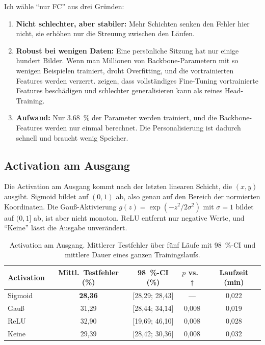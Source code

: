 Ich wähle \enquote{nur FC} aus drei Gründen:
\begin{enumerate}[nosep]
  \item \textbf{Nicht schlechter, aber stabiler:} Mehr Schichten senken den
        Fehler hier nicht, sie erhöhen nur die Streuung zwischen den Läufen.
  \item \textbf{Robust bei wenigen Daten:} Eine persönliche Sitzung hat nur
        einige hundert Bilder. Wenn man Millionen von Backbone-Parametern mit
        so wenigen Beispielen trainiert, droht Overfitting, und die
        vortrainierten Features werden verzerrt. \citet{kumar2022finetuning}
        zeigen, dass vollständiges Fine-Tuning vortrainierte Features
        beschädigen und schlechter generalisieren kann als reines
        Head-Training.
  \item \textbf{Aufwand:} Nur \SI{3,68}{\percent} der Parameter werden
        trainiert, und die Backbone-Features werden nur einmal berechnet. Die
        Personalisierung ist dadurch schnell und braucht wenig Speicher.
\end{enumerate}

\subsection{Activation am Ausgang}
\label{sec:activation}

Die Activation am Ausgang kommt nach der letzten linearen Schicht, die
$(x,y)$ ausgibt. Sigmoid bildet auf $(0,1)$ ab, also genau auf den Bereich der
normierten Koordinaten. Die Gauß-Aktivierung $g(z)=\exp(-z^2/2\sigma^2)$ mit
$\sigma=1$ bildet auf $(0,1]$ ab, ist aber nicht monoton. ReLU entfernt nur
negative Werte, und \enquote{Keine} lässt die Ausgabe unverändert.

\begin{table}[htbp]
  \centering
  \caption[Activation am Ausgang]{Activation am Ausgang. Mittlerer Testfehler über fünf Läufe mit
           \SI{98}{\percent}-CI und mittlere Dauer eines ganzen
           Trainingslaufs.}
  \label{tab:activation}
  \small
  \begin{tabular}{lcccc}
    \toprule
    Activation & Mittl.\ Testfehler (\%) & \SI{98}{\percent}-CI (\%) & $p$ vs.\ $\dagger$ & Laufzeit (min) \\
    \midrule
    Sigmoid\sel{}    & \textbf{28,36} & [28,29; 28,43] & ---   & 0,022 \\
    Gauß             & 31,29 & [28,44; 34,14] & 0,008 & 0,019 \\
    ReLU             & 32,90 & [19,69; 46,10] & 0,008 & 0,028 \\
    Keine            & 29,39 & [28,42; 30,36] & 0,008 & 0,032 \\
    \bottomrule
  \end{tabular}
\end{table}

